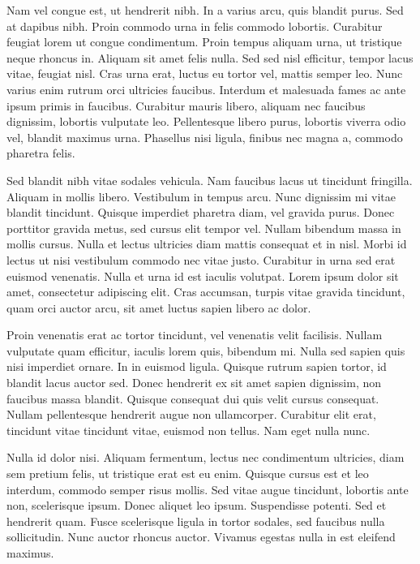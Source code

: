 \documentclass{article}
\begin{document}
Nam vel congue est, ut hendrerit nibh. In a varius arcu, quis blandit purus. Sed at dapibus nibh. Proin commodo urna in felis commodo lobortis. Curabitur feugiat lorem ut congue condimentum. Proin tempus aliquam urna, ut tristique neque rhoncus in. Aliquam sit amet felis nulla. Sed sed nisl efficitur, tempor lacus vitae, feugiat nisl. Cras urna erat, luctus eu tortor vel, mattis semper leo. Nunc varius enim rutrum orci ultricies faucibus. Interdum et malesuada fames ac ante ipsum primis in faucibus. Curabitur mauris libero, aliquam nec faucibus dignissim, lobortis vulputate leo. Pellentesque libero purus, lobortis viverra odio vel, blandit maximus urna. Phasellus nisi ligula, finibus nec magna a, commodo pharetra felis.

Sed blandit nibh vitae sodales vehicula. Nam faucibus lacus ut tincidunt fringilla. Aliquam in mollis libero. Vestibulum in tempus arcu. Nunc dignissim mi vitae blandit tincidunt. Quisque imperdiet pharetra diam, vel gravida purus. Donec porttitor gravida metus, sed cursus elit tempor vel. Nullam bibendum massa in mollis cursus. Nulla et lectus ultricies diam mattis consequat et in nisl. Morbi id lectus ut nisi vestibulum commodo nec vitae justo. Curabitur in urna sed erat euismod venenatis. Nulla et urna id est iaculis volutpat. Lorem ipsum dolor sit amet, consectetur adipiscing elit. Cras accumsan, turpis vitae gravida tincidunt, quam orci auctor arcu, sit amet luctus sapien libero ac dolor.

Proin venenatis erat ac tortor tincidunt, vel venenatis velit facilisis. Nullam vulputate quam efficitur, iaculis lorem quis, bibendum mi. Nulla sed sapien quis nisi imperdiet ornare. In in euismod ligula. Quisque rutrum sapien tortor, id blandit lacus auctor sed. Donec hendrerit ex sit amet sapien dignissim, non faucibus massa blandit. Quisque consequat dui quis velit cursus consequat. Nullam pellentesque hendrerit augue non ullamcorper. Curabitur elit erat, tincidunt vitae tincidunt vitae, euismod non tellus. Nam eget nulla nunc.

Nulla id dolor nisi. Aliquam fermentum, lectus nec condimentum ultricies, diam sem pretium felis, ut tristique erat est eu enim. Quisque cursus est et leo interdum, commodo semper risus mollis. Sed vitae augue tincidunt, lobortis ante non, scelerisque ipsum. Donec aliquet leo ipsum. Suspendisse potenti. Sed et hendrerit quam. Fusce scelerisque ligula in tortor sodales, sed faucibus nulla sollicitudin. Nunc auctor rhoncus auctor. Vivamus egestas nulla in est eleifend maximus.
\end{document}
